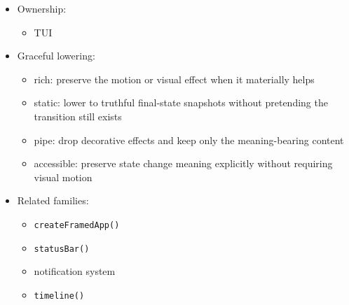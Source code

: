 \begin{itemize}
  \begin{itemize}
  \tightlist
  \item
    \texttt{c\allowbreak{}a\allowbreak{}n\allowbreak{}v\allowbreak{}a\allowbreak{}s\allowbreak{}(\allowbreak{})} should be reserved for deliberate visual moments such as splash surfaces, atmospheric backgrounds, or specialized visual regions, not routine productivity chrome
  \item
    transition shaders should reinforce page or workspace change, not compete with the content being changed
  \item
    animation timing should support comprehension and must have an honest reduced-motion or non-interactive fallback
  \item
    shader overrides should preserve semantic content where possible and avoid turning ordinary task flows into spectacle
  \end{itemize}
\item
  Ownership:

  \begin{itemize}
  \tightlist
  \item
    TUI
  \end{itemize}
\item
  Graceful lowering:

  \begin{itemize}
  \tightlist
  \item
    rich: preserve the motion or visual effect when it materially helps
  \item
    static: lower to truthful final-state snapshots without pretending the transition still exists
  \item
    pipe: drop decorative effects and keep only the meaning-bearing content
  \item
    accessible: preserve state change meaning explicitly without requiring visual motion
  \end{itemize}
\item
  Related families:

  \begin{itemize}
  \tightlist
  \item
    \texttt{c\allowbreak{}r\allowbreak{}e\allowbreak{}a\allowbreak{}t\allowbreak{}e\allowbreak{}F\allowbreak{}r\allowbreak{}a\allowbreak{}m\allowbreak{}e\allowbreak{}d\allowbreak{}A\allowbreak{}p\allowbreak{}p\allowbreak{}(\allowbreak{})}
  \item
    \texttt{s\allowbreak{}t\allowbreak{}a\allowbreak{}t\allowbreak{}u\allowbreak{}s\allowbreak{}B\allowbreak{}a\allowbreak{}r\allowbreak{}(\allowbreak{})}
  \item
    notification system
  \item
    \texttt{t\allowbreak{}i\allowbreak{}m\allowbreak{}e\allowbreak{}l\allowbreak{}i\allowbreak{}n\allowbreak{}e\allowbreak{}(\allowbreak{})}
  \end{itemize}
\end{itemize}

